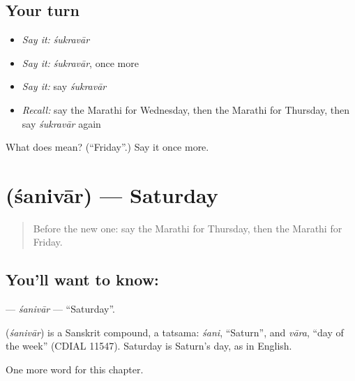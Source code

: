 \subsection*{Your turn}
\begin{itemize}
\raggedright
  \item \emph{Say it:} \emph{śukravār}
  \item \emph{Say it:} \emph{śukravār}, once more
  \item \emph{Say it:} say \emph{śukravār}
  \item \emph{Recall:} say the Marathi for Wednesday, then the Marathi for Thursday, then say \emph{śukravār} again
\end{itemize}

\begin{tcolorbox}[breakable,colback=teal!4,colframe=teal!35!black,title={Before you move on}]
What does  mean? (\textquotedblleft{}Friday\textquotedblright{}.) Say it once more.
\end{tcolorbox}
\section[\texorpdfstring{\mr{शनिवार} (śanivār)}{शनिवार (śanivār)}]{ (śanivār) — Saturday}

\label{lesson:MR-C125-sanivar}



\begin{quote}
Before the new one: say the Marathi for Thursday, then the Marathi for Friday.
\end{quote}

\subsection*{You'll want to know: }
\textbf{} — \emph{śanivār} — \textquotedblleft{}Saturday\textquotedblright{}.

\begin{cousinweb}
\textbf{} (\emph{śanivār}) is a Sanskrit compound, a tatsama: \emph{śani}, \textquotedblleft{}Saturn\textquotedblright{}, and \emph{vāra}, \textquotedblleft{}day of the week\textquotedblright{} (CDIAL 11547). Saturday is Saturn's day, as in English.
\end{cousinweb}

\begin{grammarlens}[title={What you've built}]
One more word for this chapter.
\end{grammarlens}

